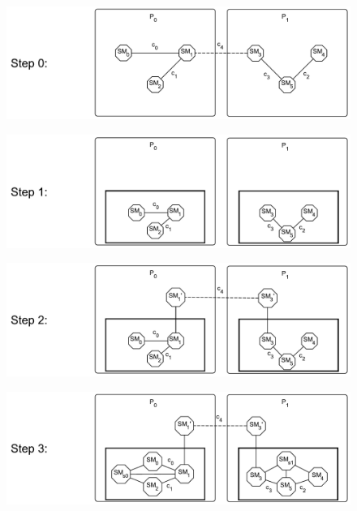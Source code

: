 \documentclass{article}
\begin{document}
	\begin{figure}[ht!]
		\center
		\includegraphics[scale=0.40]{figures/state-machines/distributed-protocol-model-transformation0.pdf}
	\end{figure}
	\begin{figure}[ht!]
		\center
		\includegraphics[scale=0.40]{figures/state-machines/distributed-protocol-model-transformation1.pdf}
	\end{figure}
	\begin{figure}[ht!]
		\center
		\includegraphics[scale=0.40]{figures/state-machines/distributed-protocol-model-transformation2.pdf}
	\end{figure}
	\begin{figure}[ht!]
		\center
		\includegraphics[scale=0.40]{figures/state-machines/distributed-protocol-model-transformation3.pdf}
	\end{figure}
\end{document}

